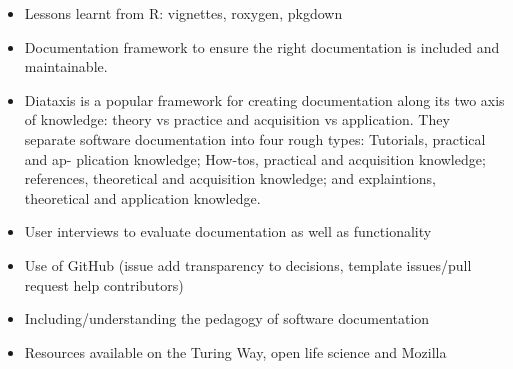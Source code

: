 \documentclass{SBCbookchapter}
\begin{document}
\begin{itemize}
    \item Lessons learnt from R: vignettes, roxygen, pkgdown
    \item Documentation framework to ensure the right documentation is included and maintainable.
    \item Diataxis is a popular framework for creating documentation along its two axis of knowledge: theory vs practice and acquisition vs application. They separate software documentation into four rough types: Tutorials, practical and ap- plication knowledge; How-tos, practical and acquisition knowledge; references, theoretical and acquisition knowledge; and explaintions, theoretical and application knowledge. %
    \item User interviews to evaluate documentation as well as functionality
    \item Use of GitHub (issue add transparency to decisions, template issues/pull request help contributors)
    \item Including/understanding the pedagogy of software documentation
    \item Resources available on the Turing Way, open life science and Mozilla
\end{itemize}




\end{document}
